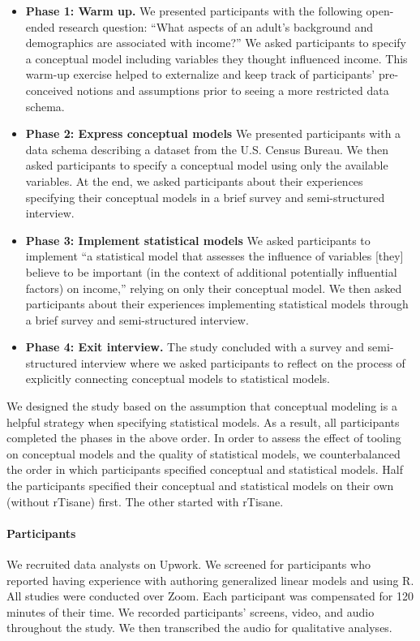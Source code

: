 \begin{itemize}
    \item \textbf{Phase 1: Warm up.} We presented participants with the
    following open-ended research question: ``What aspects of an adult’s
    background and demographics are associated with income?'' We asked
    participants to specify a conceptual model including variables they thought
    influenced income. This warm-up exercise helped to externalize and keep
    track of participants' pre-conceived notions and assumptions prior to seeing
    a more restricted data schema.
    \item \textbf{Phase 2: Express conceptual models} We presented participants
    with a data schema describing a dataset from the U.S. Census Bureau. We then
    asked participants to specify a conceptual model using only the available
    variables. At the end, we asked participants about their
    experiences specifying their conceptual models in a brief survey and semi-structured interview.
    \item \textbf{Phase 3: Implement statistical models} We asked participants
    to implement ``a statistical model that assesses the influence of variables
    [they] believe to be important (in the context of additional potentially
    influential factors) on income,'' relying on only their conceptual model. We
    then asked participants about their experiences implementing statistical
    models through a brief survey and semi-structured interview. 
    \item \textbf{Phase 4: Exit interview.} The study concluded with a survey
    and semi-structured interview where we asked participants to reflect on the
    process of explicitly connecting conceptual models to statistical models.
\end{itemize} 

We designed the study based on the assumption that conceptual modeling is a
helpful strategy when specifying statistical models. As a result, all
participants completed the phases in the above order. In order to assess the
effect of tooling on conceptual models and the quality of statistical models, we
counterbalanced the order in which participants specified conceptual and
statistical models. Half the participants specified their conceptual and
statistical models on their own (without rTisane) first. The other started with
rTisane.

\noindent \paragraph{Participants} We recruited  data analysts on
Upwork. We screened for participants who reported having experience with
authoring generalized linear models and using R.  All
studies were conducted over Zoom. Each participant was compensated  for
120 minutes of their time. We recorded participants' screens, video, and audio
throughout the study. We then transcribed the audio for qualitative analyses.

